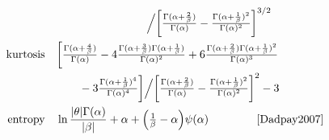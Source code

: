 \begin{table*}[pt!]
\begin{align*}
 \hspace{-3em}
 \\ & \qquad \qquad \qquad \qquad \Big /
 \Left[  \tfrac{\Gamma(\alpha+\frac{2}{\beta})}{\Gamma(\alpha)}  - 
\tfrac{\Gamma(\alpha+\frac{1}{\beta})^2}{\Gamma(\alpha)^2}    \Right]^{3/2}
\hspace{-3em}
\checked
\\
\text{kurtosis} \quad  &  
 \bigg[  \tfrac{\Gamma(\alpha+\frac{4}{\beta})}{\Gamma(\alpha)} 
 - 4 \tfrac{\Gamma(\alpha+\frac{3}{\beta})\Gamma(\alpha+\frac{1}{\beta})}{\Gamma(\alpha)^2}    
 + 6 \tfrac{\Gamma(\alpha+\frac{2}{\beta})\Gamma(\alpha+\frac{1}{\beta})^2}{\Gamma(\alpha)^3}    
\hspace{-3em}
\checked
 \\ & \qquad 
 -3  \tfrac{\Gamma(\alpha+\frac{1}{\beta})^4}{\Gamma(\alpha)^4}   \bigg]
 \Big /
 \Left[  \tfrac{\Gamma(\alpha+\frac{2}{\beta})}{\Gamma(\alpha)}  - 
\tfrac{\Gamma(\alpha+\frac{1}{\beta})^2}{\Gamma(\alpha)^2}    \Right]^{2}
-3 
\hspace{-3em}
\\
\text{entropy} \quad& 
\ln \frac{|\theta| \Gamma(\alpha)}{|\beta|} +\alpha + \Left( \sfrac{1}{\beta} - \alpha\Right) \psi(\alpha) \checked &
\text{\cite{Dadpay2007}}
\end{align*}
\end{table*}


